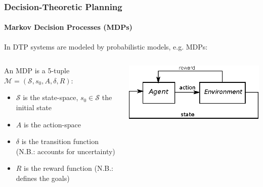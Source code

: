 \begin{frame}
\frametitle{Decision-Theoretic Planning}
\framesubtitle{Markov Decision Processes (MDPs)}

In DTP systems are modeled by probabilistic models, e.g. MDPs:
\begin{columns}[T]
\begin{column}{0.65\textwidth}
	\begin{definition}
	An MDP is a 5-tuple $\mathcal{M} = (\mathcal{S}, s_0, A, \delta, R)$:
	\begin{itemize}
		\item $\mathcal{S}$ is the state-space, $s_0 \in \mathcal{S}$ the initial state
		\item $A$ is the action-space
		\item $\delta$ is the transition function (N.B.: accounts for uncertainty) %
		\item $R$ is the reward function (N.B.: defines the goals)
	\end{itemize}
	\end{definition}
\end{column}

\begin{column}{0.375\textwidth}
	\vspace{32pt}
\includegraphics{figures/mdp}
\end{column}
\end{columns}
\end{frame}

